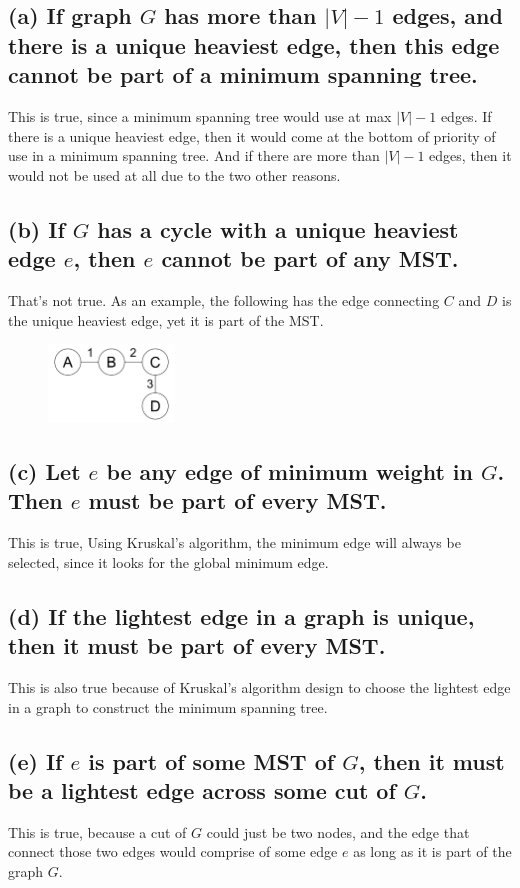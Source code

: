 \documentclass[10pt,letterpaper]{article}
\begin{document}
\subsection*{(a) If graph $G$ has more than $|V| - 1$ edges, and there is a unique heaviest edge, then this edge cannot be part of a minimum spanning tree.}
This is true, since a minimum spanning tree would use at max $|V| - 1$ edges. If there is a unique heaviest edge, then it would come at the bottom of priority of use in a minimum spanning tree. And if there are more than $|V| - 1$ edges, then it would not be used at all due to the two other reasons. 
\subsection*{(b) If $G$ has a cycle with a unique heaviest edge $e$, then $e$ cannot be part of any MST.}
That's not true. As an example, the following has the edge connecting $C$ and $D$ is the unique heaviest edge, yet it is part of the MST. 
\begin{figure}[h!]
\centering
\includegraphics[width=0.3\textwidth]{"b) Graph.png"}
\end{figure}
\subsection*{(c) Let $e$ be any edge of minimum weight in $G$. Then $e$ must be part of every MST.}
This is true, Using Kruskal's algorithm, the minimum edge will always be selected, since it looks for the global minimum edge. 
\subsection*{(d) If the lightest edge in a graph is unique, then it must be part of every MST.}
This is also true because of Kruskal's algorithm design to choose the lightest edge in a graph to construct the minimum spanning tree. 
\subsection*{(e) If $e$ is part of some MST of $G$, then it must be a lightest edge across some cut of $G$.}
This is true, because a cut of $G$ could just be two nodes, and the edge that connect those two edges would comprise of some edge $e$ as long as it is part of the graph $G$. 
\end{document}
